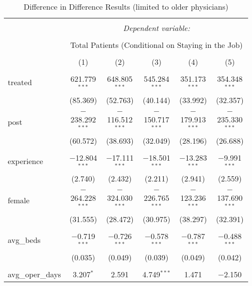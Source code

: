 
\begin{table}[!htbp] \centering 
  \caption{Difference in Difference Results (limited to older physicians)} 
  \label{} 
\begin{tabular}{@{\extracolsep{5pt}}lccccc} 
\\[-1.8ex]\hline 
\hline \\[-1.8ex] 
 & \multicolumn{5}{c}{\textit{Dependent variable:}} \\ 
\cline{2-6} 
\\[-1.8ex] & \multicolumn{5}{c}{Total Patients (Conditional on Staying in the Job)} \\ 
\\[-1.8ex] & (1) & (2) & (3) & (4) & (5)\\ 
\hline \\[-1.8ex] 
 treated & 621.779$^{***}$ & 648.805$^{***}$ & 545.284$^{***}$ & 351.173$^{***}$ & 354.348$^{***}$ \\ 
  & (85.369) & (52.763) & (40.144) & (33.992) & (32.357) \\ 
  & & & & & \\ 
 post & $-$238.292$^{***}$ & $-$116.512$^{***}$ & $-$150.717$^{***}$ & $-$179.913$^{***}$ & $-$235.330$^{***}$ \\ 
  & (60.572) & (38.693) & (32.049) & (28.196) & (26.688) \\ 
  & & & & & \\ 
 experience & $-$12.804$^{***}$ & $-$17.111$^{***}$ & $-$18.501$^{***}$ & $-$13.283$^{***}$ & $-$9.991$^{***}$ \\ 
  & (2.740) & (2.432) & (2.211) & (2.941) & (2.559) \\ 
  & & & & & \\ 
 female & $-$264.228$^{***}$ & $-$324.030$^{***}$ & $-$226.765$^{***}$ & $-$123.236$^{***}$ & $-$137.690$^{***}$ \\ 
  & (31.555) & (28.472) & (30.975) & (38.297) & (32.391) \\ 
  & & & & & \\ 
 avg\_beds & $-$0.719$^{***}$ & $-$0.726$^{***}$ & $-$0.578$^{***}$ & $-$0.787$^{***}$ & $-$0.488$^{***}$ \\ 
  & (0.035) & (0.049) & (0.039) & (0.049) & (0.042) \\ 
  & & & & & \\ 
 avg\_oper\_days & 3.207$^{*}$ & 2.591 & 4.749$^{***}$ & 1.471 & $-$2.150 \\ 

\end{tabular}
\end{table}
